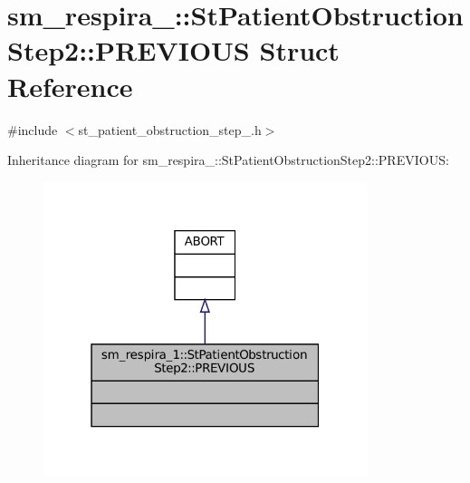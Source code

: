 \hypertarget{structsm__respira__1_1_1StPatientObstructionStep2_1_1PREVIOUS}{}\section{sm\+\_\+respira\+\_\+:\+:St\+Patient\+Obstruction\+Step2\+:\+:P\+R\+E\+V\+I\+O\+US Struct Reference}
\label{structsm__respira__1_1_1StPatientObstructionStep2_1_1PREVIOUS}


{\ttfamily \#include $<$st\+\_\+patient\+\_\+obstruction\+\_\+step\+\_.\+h$>$}



Inheritance diagram for sm\+\_\+respira\+\_\+:\+:St\+Patient\+Obstruction\+Step2\+:\+:P\+R\+E\+V\+I\+O\+US\+:
\nopagebreak
\begin{figure}[H]
\begin{center}
\leavevmode
\includegraphics[width=268pt]{structsm__respira__1_1_1StPatientObstructionStep2_1_1PREVIOUS__inherit__graph}
\end{center}
\end{figure}


